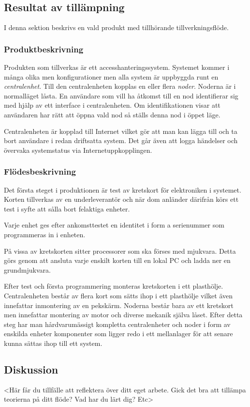 \documentclass{article}
\begin{document}
\subsection*{Resultat av tillämpning}
I denna sektion beskrivs en vald produkt med tillhörande tillverkningsflöde.
\subsubsection*{Produktbeskrivning}
Produkten som tillverkas är ett accesshanteringssystem. Systemet kommer i många olika men konfigurationer men alla system är  uppbyggda runt en \emph{centralenhet}. Till den centralenheten kopplas en eller flera \emph{noder}. Noderna är i normalläget låsta. En användare som vill ha åtkomst till en nod identifierar sig med hjälp av ett interface i centralenheten. Om identifikationen visar att användaren har rätt att öppna vald nod så ställs denna nod i öppet läge.

Centralenheten är kopplad till Internet vilket gör att man kan lägga till och ta bort användare i redan driftsatta system. Det går även att logga händelser och övervaka systemstatus via Internetuppkopplingen.
\subsubsection*{Flödesbeskrivning}
Det första steget i produktionen är test av kretskort för elektroniken i systemet. Korten tillverkas av en underleverantör och när dom anländer därifrån körs ett test i syfte att sålla bort felaktiga enheter.

Varje enhet ges efter ankomsttestet en identitet i form a serienummer som programmeras in i enheten.

På vissa av kretskorten sitter processorer som ska förses med mjukvara. Detta görs genom att ansluta varje enskilt korten till en lokal PC och ladda ner en grundmjukvara. 
 
Efter test och första programmering monteras kretskorten i ett plasthölje. Centralenheten består av flera kort som sätts ihop i ett plasthölje vilket även innefattar inmontering av en pekskärm. Noderna består bara av ett kretskort men innefattar montering av motor och diverse mekanik själva låset. Efter detta steg har man hårdvarumässigt kompletta centralenheter och   noder i form av enskilda enheter komponenter som ligger redo i ett mellanlager för att senare kunna sättas ihop till ett system.



\subsection*{Diskussion}
<Här får du tillfälle att reflektera över ditt eget arbete. Gick det bra att tillämpa teorierna på ditt
flöde? Vad har du lärt dig? Etc>
\end{document}
